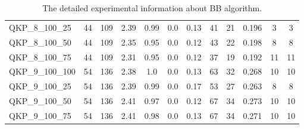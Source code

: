 \begin{table}[!h]
{\begin{tabular}{lccccccccccc}
QKP\_8\_100\_25 & 44 & 109 & 2.39 & 0.99 & 0.0 & 0.13 & 41 & 21 & 0.196 & 3 & 3\\
QKP\_8\_100\_50 & 44 & 109 & 2.35 & 0.95 & 0.0 & 0.12 & 43 & 22 & 0.198 & 8 & 8\\
QKP\_8\_100\_75 & 44 & 109 & 2.31 & 0.95 & 0.0 & 0.12 & 37 & 19 & 0.192 & 11 & 11\\
QKP\_9\_100\_100 & 54 & 136 & 2.38 & 1.0 & 0.0 & 0.13 & 63 & 32 & 0.268 & 10 & 10\\
QKP\_9\_100\_25 & 54 & 136 & 2.39 & 0.99 & 0.0 & 0.17 & 53 & 27 & 0.263 & 8 & 8\\
QKP\_9\_100\_50 & 54 & 136 & 2.41 & 0.97 & 0.0 & 0.12 & 67 & 34 & 0.273 & 10 & 10\\
QKP\_9\_100\_75 & 54 & 136 & 2.41 & 0.98 & 0.0 & 0.13 & 67 & 34 & 0.271 & 10 & 10\\
\bottomrule
\end{tabular}%
}%
\caption{The detailed experimental information about BB algorithm.}
\label{tab:table_$m}
\end{table}

